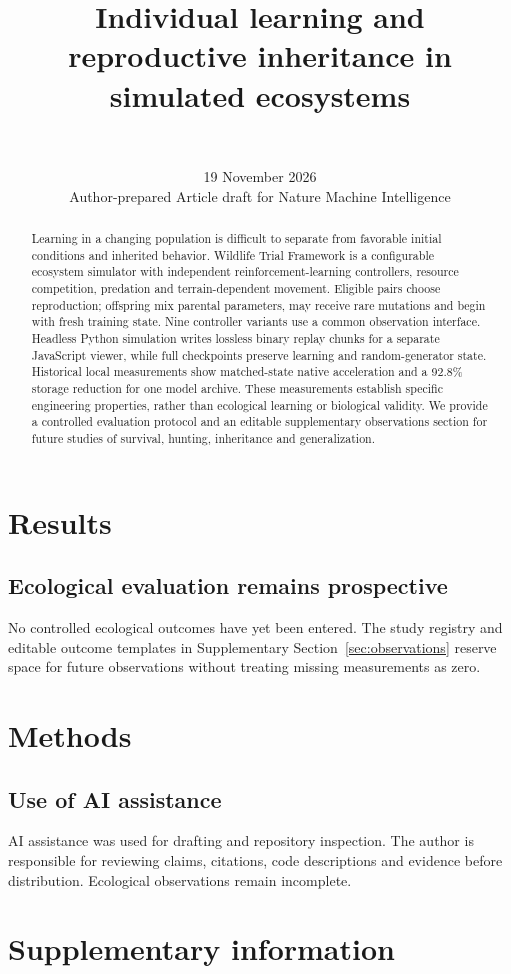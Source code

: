 \documentclass[11pt]{article}
\title{Individual learning and reproductive inheritance in simulated ecosystems}
\author{\paperauthor\\[4pt]\begin{minipage}{.95\textwidth}\centering\small\paperauthorcontacts\end{minipage}}
\date{19 November 2026\\\small Author-prepared Article draft for Nature Machine Intelligence}
\newif\ifpaperlinenumbers
\begin{document}
\maketitle
\begin{abstract}
Learning in a changing population is difficult to separate from favorable
initial conditions and inherited behavior. Wildlife Trial Framework is a
configurable ecosystem simulator with independent reinforcement-learning
controllers, resource competition, predation and terrain-dependent movement.
Eligible pairs choose reproduction; offspring mix parental parameters, may
receive rare mutations and begin with fresh training state. Nine controller
variants use a common observation interface. Headless Python simulation writes
lossless binary replay chunks for a separate JavaScript viewer, while full
checkpoints preserve learning and random-generator state. Historical local
measurements show matched-state native acceleration and a 92.8\% storage
reduction for one model archive. These measurements establish specific
engineering properties, rather than ecological learning or biological validity.
We provide a controlled evaluation protocol and an editable supplementary
observations section for future studies of survival, hunting, inheritance and
generalization.
\end{abstract}
\ifpaperlinenumbers\linenumbers\fi

\section*{Results}


\subsection*{Ecological evaluation remains prospective}
No controlled ecological outcomes have yet been entered. The study registry and
editable outcome templates in Supplementary Section~\ref{sec:observations} reserve
space for future observations without treating missing measurements as zero.

\clearpage
\section*{Methods}





\subsection{Use of AI assistance}
AI assistance was used for drafting and repository inspection. The author is
responsible for reviewing claims, citations, code descriptions and evidence
before distribution. Ecological observations remain incomplete.

\clearpage


\clearpage
\appendix
\setcounter{secnumdepth}{2}
\setcounter{table}{0}
\renewcommand{\thetable}{S\arabic{table}}
\renewcommand{\theHtable}{supp.\arabic{table}}
\section*{Supplementary information}

\clearpage

\clearpage

\end{document}
